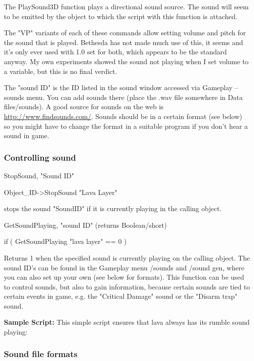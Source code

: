 The PlaySound3D function plays a directional sound source. The sound
will seem to be emitted by the object to which the script with this
function is attached.

The "VP" variants of each of these commands allow setting volume and
pitch for the sound that is played. Bethesda has not made much use of
this, it seems and it's only ever used with 1.0 set for both, which
appears to be the standard anyway. My own experiments showed the sound
not playing when I set volume to a variable, but this is no final
verdict.

The "sound ID" is the ID listed in the sound window accessed via
Gameplay -- sounds menu. You can add sounds there (place the .wav file
somewhere in Data files/sounds). A good source for sounds on the web is
\url{http://www.findsounds.com/}. Sounds should be in a certain format
(see below) so you might have to change the format in a suitable program
if you don't hear a sound in game.

\hypertarget{controlling-sound}{%
\subsubsection{Controlling sound}\label{controlling-sound}}

StopSound, "Sound ID"

Object\_ID-\textgreater StopSound "Lava Layer"

stops the sound "SoundID" if it is currently playing in the calling
object.

GetSoundPlaying, "sound ID" (returns Boolean/short)

if ( GetSoundPlaying "lava layer" == 0 )

Returns 1 when the specified sound is currently playing on the calling
object. The sound ID's can be found in the Gameplay menu /sounds and
/sound gen, where you can also set up your own (see below for formats).
This function can be used to control sounds, but also to gain
information, because certain sounds are tied to certain events in game,
e.g. the "Critical Damage" sound or the "Disarm trap" sound.

\textbf{Sample Script:} This simple script ensures that lava always has
its rumble sound playing:



\hypertarget{sound-file-formats}{%
\subsubsection{Sound file formats}\label{sound-file-formats}}

